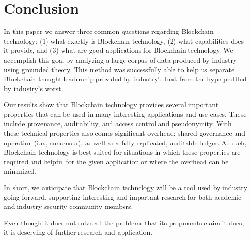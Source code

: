 
\section{Conclusion}
In this paper we answer three common questions regarding Blockchain technology: (1) what exactly is Blockchain technology, (2) what capabilities does it provide, and (3) what are good applications for Blockchain technology.
We accomplish this goal by analyzing a large corpus of data produced by industry using grounded theory.
This method was successfully able to help us separate Blockchain thought leadership provided by industry's best from the hype peddled by industry's worst.

Our results show that Blockchain technology provides several important properties that can be used in many interesting applications and use cases.  These include provenance, auditability, and access control and pseudonymity.
With these technical properties also comes significant overhead: shared governance and operation (i.e., consensus), as well as a fully replicated, auditable ledger.
As such, Blockchain technology is best suited for situations in which these properties are required and helpful for the given application or where the overhead can be minimized.

In short, we anticipate that Blockchain technology will be a tool used by industry going forward, supporting interesting and important research for both academic and industry security community members.

Even though it does not solve all the problems that its proponents claim it does, it is deserving of further research and application.